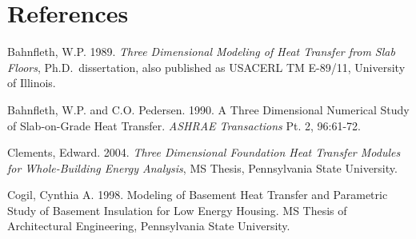 \section{References}\label{references-000}

Bahnfleth, W.P. 1989. \emph{Three Dimensional Modeling of Heat Transfer from Slab Floors}, Ph.D.~dissertation, also published as USACERL TM E-89/11, University of Illinois.

Bahnfleth, W.P. and C.O. Pedersen. 1990. A Three Dimensional Numerical Study of Slab-on-Grade Heat Transfer. \emph{ASHRAE Transactions} Pt. 2, 96:61-72.

Clements, Edward. 2004. \emph{Three Dimensional Foundation Heat Transfer Modules for Whole-Building Energy Analysis}, MS Thesis, Pennsylvania State University.

Cogil, Cynthia A. 1998. Modeling of Basement Heat Transfer and Parametric Study of Basement Insulation for Low Energy Housing. MS Thesis of Architectural Engineering, Pennsylvania State University.
